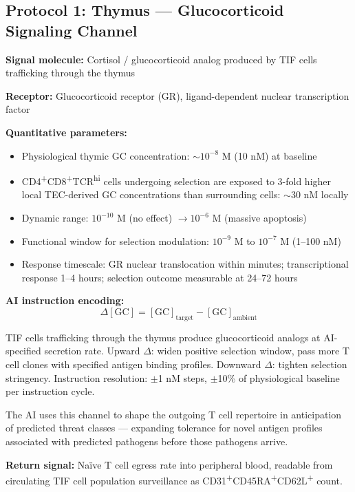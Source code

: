 \documentclass[12pt]{article}
\begin{document}
\subsection{Protocol 1: Thymus --- Glucocorticoid Signaling Channel}

\textbf{Signal molecule:} Cortisol / glucocorticoid analog produced by TIF cells trafficking through the thymus

\textbf{Receptor:} Glucocorticoid receptor (GR), ligand-dependent nuclear transcription factor

\textbf{Quantitative parameters:}
\begin{itemize}
    \item Physiological thymic GC concentration: $\sim 10^{-8}$ M (10 nM) at baseline
    \item CD4\textsuperscript{+}CD8\textsuperscript{+}TCR\textsuperscript{hi} cells undergoing selection are exposed to 3-fold higher local TEC-derived GC concentrations than surrounding cells: $\sim$30 nM locally \cite{thymic_gc_quantitation_2019}
    \item Dynamic range: $10^{-10}$ M (no effect) $\to 10^{-6}$ M (massive apoptosis)
    \item Functional window for selection modulation: $10^{-9}$ M to $10^{-7}$ M (1--100 nM)
    \item Response timescale: GR nuclear translocation within minutes; transcriptional response 1--4 hours; selection outcome measurable at 24--72 hours
\end{itemize}

\textbf{AI instruction encoding:}
$$\Delta[\text{GC}] = [\text{GC}]_{\text{target}} - [\text{GC}]_{\text{ambient}}$$

TIF cells trafficking through the thymus produce glucocorticoid analogs at AI-specified secretion rate. Upward $\Delta$: widen positive selection window, pass more T cell clones with specified antigen binding profiles. Downward $\Delta$: tighten selection stringency. Instruction resolution: $\pm$1 nM steps, $\pm$10\% of physiological baseline per instruction cycle.

The AI uses this channel to shape the outgoing T cell repertoire in anticipation of predicted threat classes --- expanding tolerance for novel antigen profiles associated with predicted pathogens before those pathogens arrive.

\textbf{Return signal:} Naïve T cell egress rate into peripheral blood, readable from circulating TIF cell population surveillance as CD31\textsuperscript{+}CD45RA\textsuperscript{+}CD62L\textsuperscript{+} count.
\end{document}
